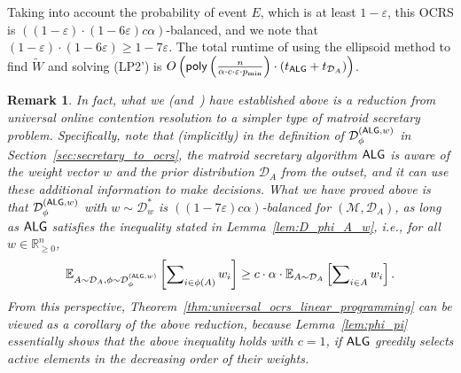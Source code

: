 \documentclass[11pt]{article}
\newcommand{\D}{\mathcal D}
\def \E {\mathbb{E}}
\newcommand{\M}{{\mathcal M}}
\newcommand{\alg}{\textnormal{\sffamily ALG}}
\newcommand{\eps}{\varepsilon}
\newcommand{\poly}{\textnormal{\sffamily poly}}
\newcommand{\R}{{\mathbb R}}
\newtheorem{remark}{Remark}[section]
\begin{document}
Taking into account the probability of event $E$, which is at least $1-\eps$, this OCRS is $((1-\eps)\cdot(1-6\eps)c\alpha)$-balanced, and we note that $(1-\eps)\cdot(1-6\eps)\ge1-7\eps$. The total runtime of using the ellipsoid method to find $\tilde{W}$ and solving (LP2') is $O\left(\poly\left(\frac{n}{\alpha\cdot c\cdot\eps\cdot p_{\min}}\right)\cdot(t_{\alg}+t_{\D_{A}})\right)$.

\begin{remark} In fact, what we (and~\citet{dughmi2020outer}) have established above is a reduction from universal online contention resolution to a simpler type of matroid secretary problem. Specifically, note that (implicitly) in the definition of $\D_{\phi}^{(\alg,w)}$ in Section~\ref{sec:secretary_to_ocrs}, the matroid secretary algorithm $\alg$ is aware of the weight vector $w$ and the prior distribution $\D_A$ from the outset, and it can use these additional information to make decisions. What we have proved above is that $\D_{\phi}^{(\alg,w)}$ with $w\sim\D_w^*$ is $((1-7\eps)c\alpha)$-balanced for $(\M,\D_A)$, as long as $\alg$ satisfies the inequality stated in Lemma~\ref{lem:D_phi_A_w}, i.e., for all $w\in\R_{\ge0}^n$,
\[
\E_{A\sim\D_A,\phi\sim\D_{\phi}^{(\alg,w)}}\left[\sum\nolimits_{i\in\phi(A)} w_i\right]\ge c\cdot\alpha\cdot\E_{A\sim\D_A}\left[\sum\nolimits_{i\in A} w_i\right].
\]
From this perspective, Theorem~\ref{thm:universal_ocrs_linear_programming} can be viewed as a corollary of the above reduction, because Lemma~\ref{lem:phi_pi} essentially shows that the above inequality holds with $c=1$, if $\alg$ greedily selects active elements in the decreasing order of their weights.
\end{remark} 
\end{document}
